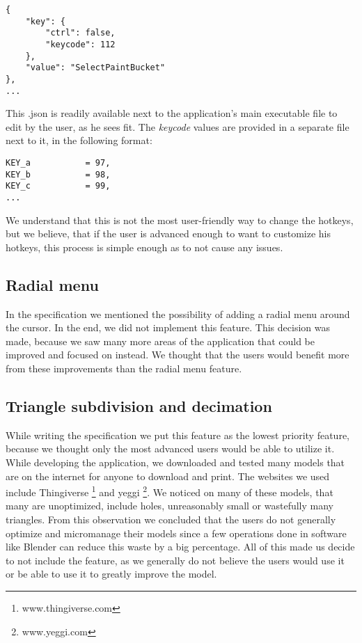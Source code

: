 \begin{lstlisting}
{
    "key": {
        "ctrl": false,
        "keycode": 112
    },
    "value": "SelectPaintBucket"
},
...
\end{lstlisting}

This .json is readily available next to the application's main executable file to edit by the user, as he sees fit. The \textit{keycode} values are provided in a separate file next to it, in the following format:

\begin{lstlisting}
KEY_a			= 97,
KEY_b			= 98,
KEY_c			= 99,
...
\end{lstlisting}

We understand that this is not the most user-friendly way to change the hotkeys, but we believe, that if the user is advanced enough to want to customize his hotkeys, this process is simple enough as to not cause any issues.

\subsection{Radial menu}

In the specification we mentioned the possibility of adding a radial menu around the cursor. In the end, we did not implement this feature. This decision was made, because we saw many more areas of the application that could be improved and focused on instead. We thought that the users would benefit more from these improvements than the radial menu feature.

\subsection{Triangle subdivision and decimation}

While writing the specification we put this feature as the lowest priority feature, because we thought only the most advanced users would be able to utilize it. While developing the application, we downloaded and tested many models that are on the internet for anyone to download and print. The websites we used include Thingiverse \footnote{www.thingiverse.com} and yeggi \footnote{www.yeggi.com}. We noticed on many of these models, that many are unoptimized, include holes, unreasonably small or wastefully many triangles. From this observation we concluded that the users do not generally optimize and micromanage their models since a few operations done in software like Blender can reduce this waste by a big percentage. All of this made us decide to not include the feature, as we generally do not believe the users would use it or be able to use it to greatly improve the model.


